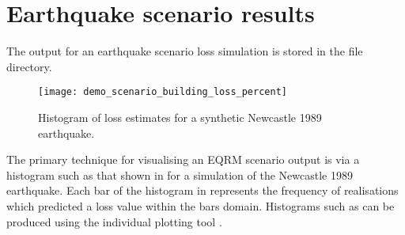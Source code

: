 \section{Earthquake scenario results}

The output for an earthquake scenario loss simulation is 
stored in the file
 directory. 
\begin{figure}
\texttt{[image: demo\_scenario\_building\_loss\_percent]}
\caption{Histogram of loss estimates for a synthetic Newcastle
1989 earthquake.} \label{fig:scenario-hist}
\end{figure}
The primary technique for visualising an EQRM scenario output is
via a histogram such as that shown in  for
a simulation of the Newcastle 1989 earthquake. Each bar of the
histogram in  represents the frequency of
realisations which predicted a loss value within the bars domain.
Histograms such as  can be produced using
the individual plotting tool
.



